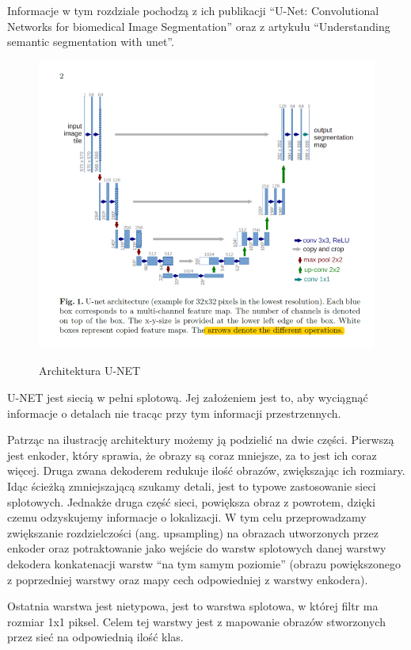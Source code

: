 \documentclass{article}
\begin{document}
Informacje w tym rozdziale pochodzą z ich publikacji ``U-Net: Convolutional Networks for biomedical Image Segmentation''\cite{unetpaper} oraz z artykułu ``Understanding semantic segmentation with unet''\cite{unet}.
\begin{figure}[H]
    \centering
    \includegraphics[width=\linewidth]{images/unet.png}
    \caption{Architektura U-NET}
    \cite{unetpaper}
    \label{Wizualizacja architektury U-NET}
\end{figure}
U-NET jest siecią w pełni splotową.
Jej założeniem jest to, aby wyciągnąć informacje o detalach nie tracąc przy tym informacji przestrzennych.

Patrząc na ilustrację architektury możemy ją podzielić na dwie części.
Pierwszą jest enkoder, który sprawia, że obrazy są coraz mniejsze, za to jest ich coraz więcej.
Druga zwana dekoderem redukuje ilość obrazów, zwiększając ich rozmiary.
Idąc ścieżką zmniejszającą szukamy detali, jest to typowe zastosowanie sieci splotowych. Jednakże druga część sieci, powiększa obraz z powrotem, dzięki czemu odzyskujemy informacje o lokalizacji.
W tym celu przeprowadzamy zwiększanie rozdzielczości (ang. upsampling) na obrazach utworzonych przez enkoder oraz potraktowanie jako wejście do warstw splotowych danej warstwy dekodera konkatenacji warstw ``na tym samym poziomie'' (obrazu powiększonego z poprzedniej warstwy oraz mapy cech odpowiedniej z warstwy enkodera).

Ostatnia warstwa jest nietypowa, jest to warstwa splotowa, w której filtr ma rozmiar 1x1 piksel. Celem tej warstwy jest z mapowanie obrazów stworzonych przez sieć na odpowiednią ilość klas.
\end{document}
